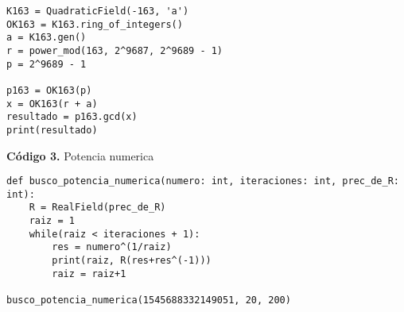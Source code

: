 \documentclass[12pt]{amsart}
\theoremstyle{plain}
\begin{document}
\lstset{
    language=Python,
    basicstyle=\ttfamily\small,
    frame=single,
    breaklines=true
}

\begin{lstlisting}
K163 = QuadraticField(-163, 'a')
OK163 = K163.ring_of_integers()
a = K163.gen()
r = power_mod(163, 2^9687, 2^9689 - 1)
p = 2^9689 - 1

p163 = OK163(p)
x = OK163(r + a)
resultado = p163.gcd(x)
print(resultado)
\end{lstlisting}

\vspace{1em}
\noindent\textbf{Código 3.} Potencia numerica
\label{codigo3}

\lstset{
    language=Python,
    basicstyle=\ttfamily\small,
    frame=single,
    breaklines=true
}

\begin{lstlisting}
def busco_potencia_numerica(numero: int, iteraciones: int, prec_de_R: int):
    R = RealField(prec_de_R)
    raiz = 1
    while(raiz < iteraciones + 1):
        res = numero^(1/raiz)
        print(raiz, R(res+res^(-1)))
        raiz = raiz+1

busco_potencia_numerica(1545688332149051, 20, 200)
\end{lstlisting}

\newpage
\end{document}
